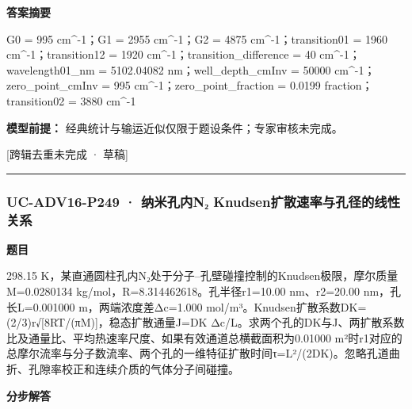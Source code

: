 \documentclass[UTF8,11pt,a4paper]{ctexart}
\begin{document}
\noindent\textbf{答案摘要}\par
G0 = 995 cm\textasciicircum{}-1；G1 = 2955 cm\textasciicircum{}-1；G2 = 4875 cm\textasciicircum{}-1；transition01 = 1960 cm\textasciicircum{}-1；transition12 = 1920 cm\textasciicircum{}-1；transition\_difference = 40 cm\textasciicircum{}-1；wavelength01\_nm = 5102.04082 nm；well\_depth\_cmInv = 50000 cm\textasciicircum{}-1；zero\_point\_cmInv = 995 cm\textasciicircum{}-1；zero\_point\_fraction = 0.0199 fraction；transition02 = 3880 cm\textasciicircum{}-1\par
\noindent\textbf{模型前提：}
经典统计与输运近似仅限于题设条件；专家审核未完成。\par
\noindent\textcolor{red!65!black}{[跨辑去重未完成 · 草稿]} \par
\medskip\hrule\medskip
{}
\subsubsection*{UC-ADV16-P249 · 纳米孔内N₂ Knudsen扩散速率与孔径的线性关系}
\noindent\textbf{题目}\par
298.15 K，某直通圆柱孔内N₂处于分子–孔壁碰撞控制的Knudsen极限，摩尔质量M=0.0280134 kg/mol，R=8.314462618。孔半径r1=10.00 nm、r2=20.00 nm，孔长L=0.001000 m，两端浓度差Δc=1.000 mol/m³。Knudsen扩散系数DK=(2/3)r√[8RT/(πM)]，稳态扩散通量J=DK Δc/L。求两个孔的DK与J、两扩散系数比及通量比、平均热速率尺度、如果有效通道总横截面积为0.01000 m²时r1对应的总摩尔流率与分子数流率、两个孔的一维特征扩散时间τ=L²/(2DK)。忽略孔道曲折、孔隙率校正和连续介质的气体分子间碰撞。\par
\medskip\noindent\textbf{分步解答}
\end{document}
